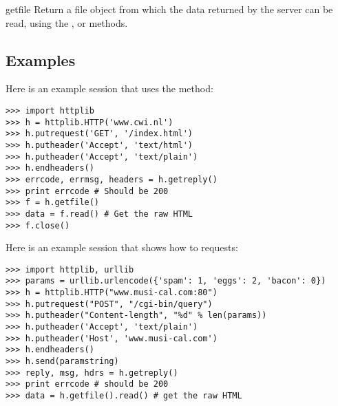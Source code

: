 \begin{methoddesc}{getfile}{}
Return a file object from which the data returned by the server can be
read, using the ,  or
 methods.
\end{methoddesc}

\subsection{Examples}

Here is an example session that uses the  method:

\begin{verbatim}
>>> import httplib
>>> h = httplib.HTTP('www.cwi.nl')
>>> h.putrequest('GET', '/index.html')
>>> h.putheader('Accept', 'text/html')
>>> h.putheader('Accept', 'text/plain')
>>> h.endheaders()
>>> errcode, errmsg, headers = h.getreply()
>>> print errcode # Should be 200
>>> f = h.getfile()
>>> data = f.read() # Get the raw HTML
>>> f.close()
\end{verbatim}

Here is an example session that shows how to  requests:

\begin{verbatim}
>>> import httplib, urllib
>>> params = urllib.urlencode({'spam': 1, 'eggs': 2, 'bacon': 0})
>>> h = httplib.HTTP("www.musi-cal.com:80")
>>> h.putrequest("POST", "/cgi-bin/query")
>>> h.putheader("Content-length", "%d" % len(params))
>>> h.putheader('Accept', 'text/plain')
>>> h.putheader('Host', 'www.musi-cal.com')
>>> h.endheaders()
>>> h.send(paramstring)
>>> reply, msg, hdrs = h.getreply()
>>> print errcode # should be 200
>>> data = h.getfile().read() # get the raw HTML
\end{verbatim}
